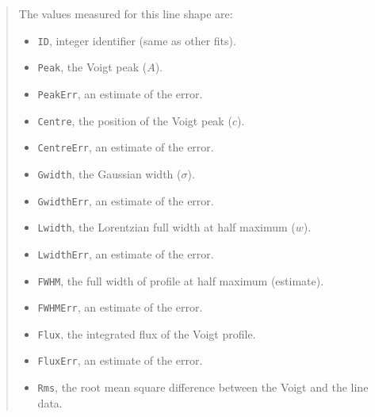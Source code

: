 \documentclass[twoside,11pt,nolof]{starlink}
\providecommand{\hitext}[1]{\texttt{#1}}
\begin{document}
\begin{quote}
 The values measured for this line shape are:
 \begin{itemize}
   \item \hitext{ID}, integer identifier (same as other fits).
   \item \hitext{Peak}, the Voigt peak ($A$).
   \item \hitext{PeakErr}, an estimate of the error.
   \item \hitext{Centre}, the position of the Voigt peak ($c$).
   \item \hitext{CentreErr}, an estimate of the error.
   \item \hitext{Gwidth}, the Gaussian width ($\sigma$).
   \item \hitext{GwidthErr}, an estimate of the error.
   \item \hitext{Lwidth}, the Lorentzian full width at half maximum ($w$).
   \item \hitext{LwidthErr}, an estimate of the error.
   \item \hitext{FWHM}, the full width of profile at half maximum (estimate).
   \item \hitext{FWHMErr}, an estimate of the error.
   \item \hitext{Flux}, the integrated flux of the Voigt profile.
   \item \hitext{FluxErr}, an estimate of the error.
   \item \hitext{Rms}, the root mean square difference between the
         Voigt and the line data.
 \end{itemize}
\end{quote}
\end{document}
